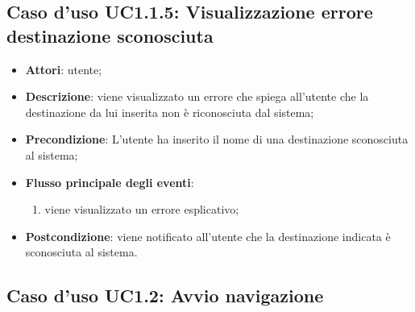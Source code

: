 \documentclass[../AnalisiDeiRequisiti.tex]{subfiles}
\begin{document}
\subsection{Caso d'uso UC1.1.5: Visualizzazione errore destinazione sconosciuta}
\begin{itemize}
	\item \textbf{Attori}: utente;
	\item \textbf{Descrizione}: viene visualizzato un errore che spiega all'utente che la destinazione da lui inserita non è riconosciuta dal sistema; 
	\item \textbf{Precondizione}: L'utente ha inserito il nome di una destinazione sconosciuta al sistema;
	
	\item \textbf{Flusso principale degli eventi}:
	\begin{enumerate}
		\item viene visualizzato un errore esplicativo;
		
	\end{enumerate}
	\item \textbf{Postcondizione}: viene notificato all'utente che la destinazione indicata è sconosciuta al sistema.
\end{itemize}
\hypertarget{UC1.2}{}
\subsection{Caso d'uso UC1.2: Avvio navigazione}
\end{document}
